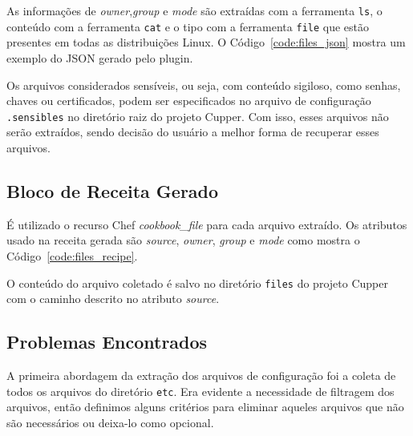As informações de \textit{owner},\textit{group} e \textit{mode} são extraídas com a ferramenta \texttt{ls},
o conteúdo com a ferramenta \texttt{cat} e o tipo com a ferramenta \texttt{file}
que estão presentes em todas as distribuições Linux.
O Código~\ref{code:files_json} mostra um exemplo do JSON gerado pelo plugin.

\noindent\begin{minipage}{\textwidth}
  \lstset{style=shell}
  
\end{minipage}\hfill

Os arquivos considerados sensíveis, ou seja, com conteúdo sigiloso, como
senhas, chaves ou certificados, podem ser especificados no arquivo de
configuração \texttt{.sensibles} no diretório raiz do projeto Cupper. Com isso,
esses arquivos não serão extraídos, sendo decisão do usuário a melhor forma
de recuperar esses arquivos.

\subsection{Bloco de Receita Gerado}

É utilizado o recurso Chef \textit{cookbook\_file} para cada arquivo extraído.
Os atributos usado na receita gerada são \textit{source}, \textit{owner},
\textit{group} e \textit{mode} como mostra o Código~\ref{code:files_recipe}.

\noindent\begin{minipage}{\textwidth}
  \lstset{style=shell}
  
\end{minipage}\hfill

O conteúdo do arquivo coletado é salvo no diretório \texttt{files} do projeto Cupper
com o caminho descrito no atributo \textit{source}.

\subsection{Problemas Encontrados}

A primeira abordagem da extração dos arquivos de configuração foi a coleta de todos
os arquivos do diretório \texttt{etc}. Era evidente a necessidade de filtragem dos
arquivos, então definimos alguns critérios para eliminar aqueles arquivos que não são
necessários ou deixa-lo como opcional.

